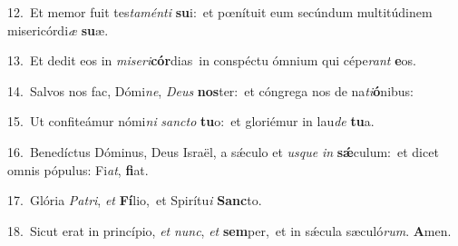 {\numbfont\textcolor{\numbcolor}{12.}}~Et memor fuit tes\-\textit{ta}\-\textit{mén}\textit{ti} \textbf{su}\-i:~\star et pœnítuit eum secúndum multitúdinem misericórdi\textit{æ} \textbf{su}\-æ.\par
{\numbfont\textcolor{\numbcolor}{13.}}~Et dedit eos in \textit{mi}\-\textit{se}\textit{ri}\textbf{cór}dias~\star in conspéctu ómnium qui cépe\textit{rant} \textbf{e}\-os.\par
{\numbfont\textcolor{\numbcolor}{14.}}~Salvos nos fac, Dómi\-\textit{ne}\-, \textit{De}\-\textit{us} \textbf{nos}\-ter:~\star et cóngrega nos de na\-\textit{ti}\-\textbf{ó}nibus:\par
{\numbfont\textcolor{\numbcolor}{15.}}~Ut confiteámur nómi\textit{ni} \textit{sanc}\-\textit{to} \textbf{tu}\-o:~\star et gloriémur in lau\textit{de} \textbf{tu}\-a.\par
{\numbfont\textcolor{\numbcolor}{16.}}~Benedíctus Dóminus, Deus Israël, a sǽculo et \textit{us}\-\textit{que} \textit{in} \textbf{sǽ}\-culum:~\star et dicet omnis pópulus: Fi\-\textit{at}\-, \textbf{fi}\-at.\par
{\numbfont\textcolor{\numbcolor}{17.}}~Glória \textit{Pa}\-\textit{tri}, \textit{et} \textbf{Fí}\-lio,~\star et Spirítu\textit{i} \textbf{Sanc}\-to.\par
{\numbfont\textcolor{\numbcolor}{18.}}~Sicut erat in princípio, \textit{et} \textit{nunc}\-, \textit{et} \textbf{sem}\-per,~\star et in sǽcula sæculó\-\textit{rum}\-. \textbf{A}\-men.\par

